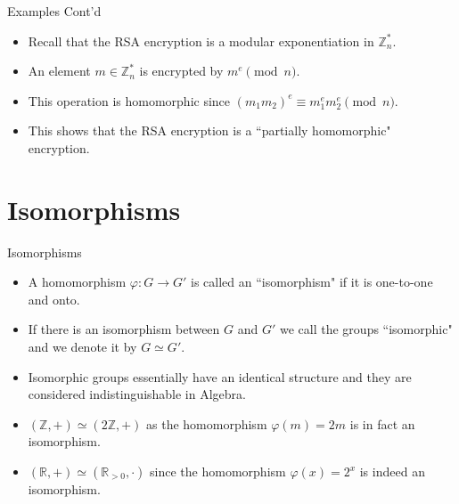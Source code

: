 \documentclass[ %
 10pt, xcolor={dvipsnames,svgnames,x11names,hyperref},
   hyperref={colorlinks=true,citecolor=green,linkcolor=DarkRed,urlcolor=ProcessBlue,anchorcolor=blue}
  ]{beamer}
\newenvironment{stepitemize}{\begin{itemize}[<+->]}{\end{itemize} }
\newcommand{\Z}{\mathbb{Z}}
\newcommand{\R}{\mathbb{R}}
\begin{document}
\begin{frame}{Examples Cont'd}
    \begin{stepitemize}
\item Recall that the RSA encryption is a modular exponentiation in $\Z_n^{*}$.
\item An element $m\in \Z_n^*$ is encrypted by $m^e
\pmod{n}$.
\item This operation is homomorphic since $(m_1m_2)^e \equiv m_1^em_2^e \pmod{n}$.
\item This shows that the RSA encryption is a ``partially homomorphic" encryption.

\end{stepitemize}

\end{frame}

\section{Isomorphisms}
\begin{frame}{Isomorphisms}
\begin{stepitemize}
\item  A homomorphism $\varphi:G\rightarrow G'$ is called an ``isomorphism" if it is one-to-one and onto.
\item If there is an isomorphism between $G$ and $G'$ we call the groups ``isomorphic" and we denote it by $G\simeq G'$.
\item  Isomorphic groups essentially have an identical structure and they are considered indistinguishable in Algebra.
 \item $(\Z, +) \simeq (2\Z, +)$ as the homomorphism $\varphi(m)=2m$ is in fact an isomorphism.
     \item $(\R, +) \simeq (\R_{>0},\cdot)$ since the homomorphism $\varphi(x) = 2^x$ is indeed an isomorphism.
\end{stepitemize}
\end{frame}
\end{document}
